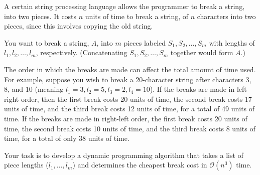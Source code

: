 \documentclass[12pt]{exam}
\newcommand{\stars}[1]{%
    \foreach \n in {1,...,#1}{%
        $\filledstar$%
    }%
}
\begin{document}
\begin{questions}
    \clearpage

    \question[50] [W10, \stars{5}] A certain string processing language allows the programmer to break a string, into two pieces. It costs $n$ units of time to break a string, of $n$ characters into two
    pieces, since this involves copying the old string.

    You want to break a string, $A$, into $m$ pieces labeled $S_1, S_2, \dots, S_m$ with lengths of $l_1, l_2, \dots, l_m$, respectively. (Concatenating $S_1, S_2, \dots, S_{m}$ together would form $A$.)

    The order in which the breaks are made can affect the total amount of time used. For example, suppose you wish to break a 20-character string after characters 3, 8, and 10 (meaning $l_1=3, l_2=5, l_3=2, l_4=10$). If the breaks are made in left-right order, then the first break costs 20 units of time, the second break costs 17 units of time, and the third break costs 12 units of time, for a total of 49 units of time. If the breaks are made in right-left order, the first break costs 20 units of time, the second break costs 10 units of time, and the third break costs 8 units of time, for a total of only 38 units of time.

    Your task is to develop a dynamic programming algorithm that takes a list of piece lengths ($l_1, \dots, l_m$) and determines the cheapest break cost in $\mathcal{O}(n^3)$ time.

\end{questions}
\end{document}
